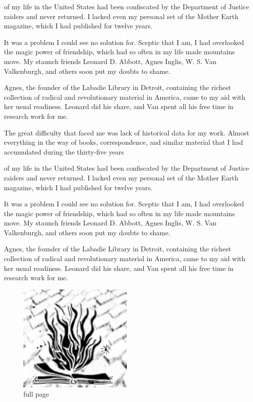 \documentclass[DIV=12,%
               BCOR=0mm,%
               fontsize=10pt,%
               oneside,%
               paper=210mm:11in]{scrbook}
\begin{document}
of my life in the United States had been confiscated by the Department
of Justice raiders and never returned. I lacked even my personal set
of the Mother Earth magazine, which I had published for twelve years.


It was a problem I could see no solution for. Sceptic that I am, I had
overlooked the magic power of friendship, which had so often in my
life made mountains move. My staunch friends Leonard D. Abbott, Agnes
Inglis, W. S. Van Valkenburgh, and others soon put my doubts to shame.


Agnes, the founder of the Labadie Library in Detroit, containing the
richest collection of radical and revolutionary material in America,
came to my aid with her usual readiness. Leonard did his share, and
Van spent all his free time in research work for me.


The great difficulty that faced me was lack of historical data for my
work. Almost everything in the way of books, correspondence, and
similar material that I had accumulated during the thirty-five years


of my life in the United States had been confiscated by the Department
of Justice raiders and never returned. I lacked even my personal set
of the Mother Earth magazine, which I had published for twelve years.


It was a problem I could see no solution for. Sceptic that I am, I had
overlooked the magic power of friendship, which had so often in my
life made mountains move. My staunch friends Leonard D. Abbott, Agnes
Inglis, W. S. Van Valkenburgh, and others soon put my doubts to shame.


Agnes, the founder of the Labadie Library in Detroit, containing the
richest collection of radical and revolutionary material in America,
came to my aid with her usual readiness. Leonard did his share, and
Van spent all his free time in research work for me.


\begin{figure}[htbp!]
\centering
\includegraphics[width=0.50\textwidth]{logo.png}
\caption[]{\noindent full page}
\end{figure}
\clearpage
\end{document}
